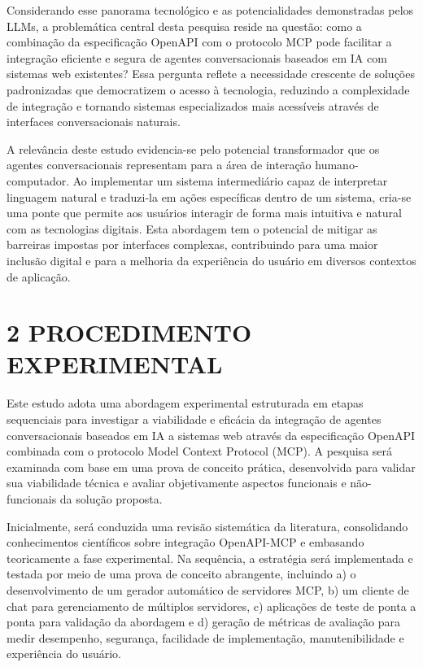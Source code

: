 \documentclass[
]{article}
\begin{document}
Considerando esse panorama tecnológico e as potencialidades demonstradas
pelos LLMs, a problemática central desta pesquisa reside na questão:
como a combinação da especificação OpenAPI com o protocolo MCP pode
facilitar a integração eficiente e segura de agentes conversacionais
baseados em IA com sistemas web existentes? Essa pergunta reflete a
necessidade crescente de soluções padronizadas que democratizem o acesso
à tecnologia, reduzindo a complexidade de integração e tornando sistemas
especializados mais acessíveis através de interfaces conversacionais
naturais.

A relevância deste estudo evidencia-se pelo potencial transformador que
os agentes conversacionais representam para a área de interação
humano-computador. Ao implementar um sistema intermediário capaz de
interpretar linguagem natural e traduzi-la em ações específicas dentro
de um sistema, cria-se uma ponte que permite aos usuários interagir de
forma mais intuitiva e natural com as tecnologias digitais. Esta
abordagem tem o potencial de mitigar as barreiras impostas por
interfaces complexas, contribuindo para uma maior inclusão digital e
para a melhoria da experiência do usuário em diversos contextos de
aplicação.

\section{2 PROCEDIMENTO EXPERIMENTAL}\label{procedimento-experimental}

Este estudo adota uma abordagem experimental estruturada em etapas
sequenciais para investigar a viabilidade e eficácia da integração de
agentes conversacionais baseados em IA a sistemas web através da
especificação OpenAPI combinada com o protocolo Model Context Protocol
(MCP). A pesquisa será examinada com base em uma prova de conceito
prática, desenvolvida para validar sua viabilidade técnica e avaliar
objetivamente aspectos funcionais e não-funcionais da solução proposta.

Inicialmente, será conduzida uma revisão sistemática da literatura,
consolidando conhecimentos científicos sobre integração OpenAPI-MCP e
embasando teoricamente a fase experimental. Na sequência, a estratégia
será implementada e testada por meio de uma prova de conceito
abrangente, incluindo a) o desenvolvimento de um gerador automático de
servidores MCP, b) um cliente de chat para gerenciamento de múltiplos
servidores, c) aplicações de teste de ponta a ponta para validação da
abordagem e d) geração de métricas de avaliação para medir desempenho,
segurança, facilidade de implementação, manutenibilidade e experiência
do usuário.
\end{document}
